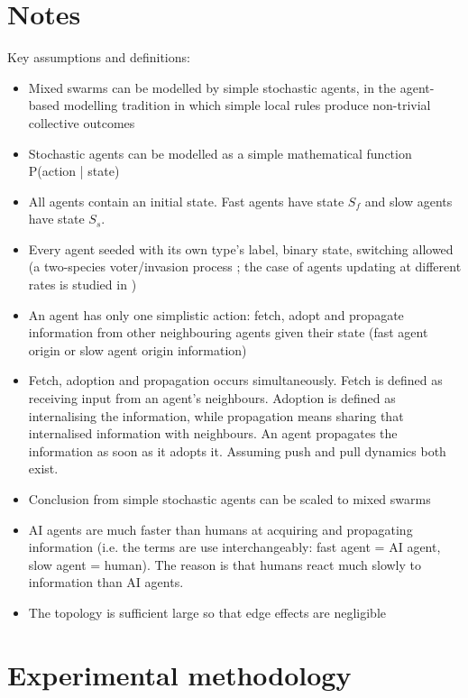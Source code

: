 \documentclass{article}
\begin{document}
\section{Notes}

Key assumptions and definitions:

\begin{itemize}
    \item Mixed swarms can be modelled by simple stochastic agents, in the agent-based modelling tradition in which simple local rules produce non-trivial collective outcomes \cite{schelling1971, epstein1996}
    \item Stochastic agents can be modelled as a simple mathematical function P(action | state)
    \item All agents contain an initial state. Fast agents have state $S_f$ and slow agents have state $S_s$.   
    \item Every agent seeded with its own type's label, binary state, switching allowed (a two-species voter/invasion process \cite{clifford1973, holley1975}; the case of agents updating at different rates is studied in \cite{sood2005, masuda2010})
    \item An agent has only one simplistic action: fetch, adopt and propagate information from other neighbouring agents given their state (fast agent origin or slow agent origin information) 
    \item Fetch, adoption and propagation occurs simultaneously. Fetch is defined as receiving input from an agent's neighbours. Adoption is defined as internalising the information, while propagation means sharing that internalised information with neighbours. An agent propagates the information as soon as it adopts it. Assuming push and pull dynamics both exist.
    \item Conclusion from simple stochastic agents can be scaled to mixed swarms
    \item AI agents are much faster than humans at acquiring and propagating information (i.e. the terms are use interchangeably: fast agent = AI agent, slow agent = human). The reason is that humans react much slowly to information than AI agents.
    \item The topology is sufficient large so that edge effects are negligible
    
\end{itemize}

\section{Experimental methodology}
\end{document}
